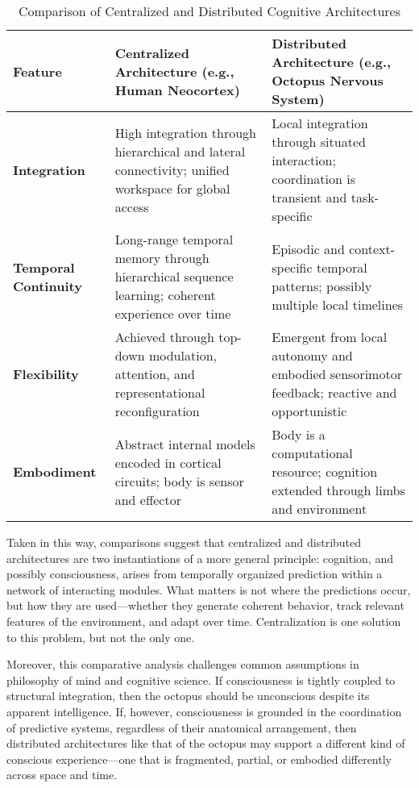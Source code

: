 \documentclass{article}
\begin{document}
\vspace{1em}
\begin{table}[ht]
\centering
\small
\caption{Comparison of Centralized and Distributed Cognitive Architectures}
\vspace{0.75em}
\begin{tabular}{|m{2.25cm}|m{4.25cm}|m{4.25cm}|}
\hline
\textbf{Feature} & \textbf{Centralized Architecture (e.g., Human Neocortex)} & \textbf{Distributed Architecture (e.g., Octopus Nervous System)} \\
\hline
\textbf{Integration} & High integration through hierarchical and lateral connectivity; unified workspace for global access & Local integration through situated interaction; coordination is transient and task-specific \\
\hline
\textbf{Temporal Continuity} & Long-range temporal memory through hierarchical sequence learning; coherent experience over time & Episodic and context-specific temporal patterns; possibly multiple local timelines \\
\hline
\textbf{Flexibility} & Achieved through top-down modulation, attention, and representational reconfiguration & Emergent from local autonomy and embodied sensorimotor feedback; reactive and opportunistic \\
\hline
\textbf{Embodiment} & Abstract internal models encoded in cortical circuits; body is sensor and effector & Body is a computational resource; cognition extended through limbs and environment \\
\hline
\end{tabular}
\label{tab:architecture_comparison}
\end{table}
\vspace{1em}

Taken in this way, comparisons suggest that centralized and distributed architectures are two instantiations of a more general principle: cognition, and possibly consciousness, arises from temporally organized prediction within a network of interacting modules. What matters is not where the predictions occur, but how they are used—whether they generate coherent behavior, track relevant features of the environment, and adapt over time. Centralization is one solution to this problem, but not the only one.

Moreover, this comparative analysis challenges common assumptions in philosophy of mind and cognitive science. If consciousness is tightly coupled to structural integration, then the octopus should be unconscious despite its apparent intelligence. If, however, consciousness is grounded in the coordination of predictive systems, regardless of their anatomical arrangement, then distributed architectures like that of the octopus may support a different kind of conscious experience—one that is fragmented, partial, or embodied differently across space and time.
\end{document}

